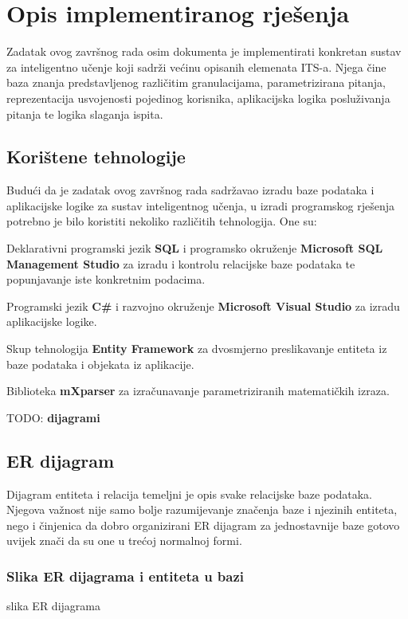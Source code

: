 \documentclass[times, utf8, zavrsni, numeric]{fer}
\begin{document}
\chapter{Opis implementiranog rješenja}
Zadatak ovog završnog rada osim dokumenta je implementirati konkretan sustav za inteligentno učenje koji sadrži većinu opisanih elemenata ITS-a. Njega čine baza znanja predstavljenog različitim granulacijama, parametrizirana pitanja, reprezentacija usvojenosti pojedinog korisnika, aplikacijska logika posluživanja pitanja te logika slaganja ispita.

\section{Korištene tehnologije}

Budući da je zadatak ovog završnog rada sadržavao izradu baze podataka i aplikacijske logike za sustav inteligentnog učenja, u izradi programskog rješenja potrebno je bilo koristiti nekoliko različitih tehnologija. One su:
\par
Deklarativni programski jezik \textbf{SQL} i programsko okruženje \textbf{Microsoft SQL Management Studio} za izradu i kontrolu relacijske baze podataka te popunjavanje iste konkretnim podacima.
\par
Programski jezik \textbf{C\#} i razvojno okruženje \textbf{Microsoft Visual Studio} za izradu aplikacijske logike.
\par
Skup tehnologija \textbf{Entity Framework} za dvosmjerno preslikavanje entiteta iz baze podataka i objekata iz aplikacije.
\par
Biblioteka \textbf{mXparser} za izračunavanje parametriziranih matematičkih izraza.
\par
TODO: \textbf{dijagrami}

\section{ER dijagram}
Dijagram entiteta i relacija temeljni je opis svake relacijske baze podataka. Njegova važnost nije samo bolje razumijevanje značenja baze i njezinih entiteta, nego i činjenica da dobro organizirani ER dijagram za jednostavnije baze gotovo uvijek znači da su one u trećoj normalnoj formi.

\pagebreak
\subsection{Slika ER dijagrama i entiteta u bazi}
slika ER dijagrama
\end{document}
